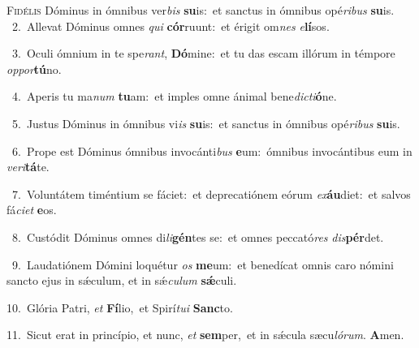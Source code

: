 \lettrine{\initial\textcolor{\initialcolor}{F}}{idélis} Dóminus in ómnibus ver\textit{bis} \textbf{su}\-is:~\star et sanctus in ómnibus opé\-\textit{ri}\-\textit{bus} \textbf{su}\-is.\\
{\numbfont\textcolor{\numbcolor}{~2.}}~Allevat Dóminus omnes \textit{qui} \textbf{cór}\-ruunt:~\star et érigit om\textit{nes} \textit{e}\-\textbf{lí}sos.\par
{\numbfont\textcolor{\numbcolor}{~3.}}~Oculi ómnium in te spe\-\textit{rant}\-, \textbf{Dó}\-mine:~\star et tu das escam illórum in témpore \textit{op}\-\textit{por}\textbf{tú}no.\par
{\numbfont\textcolor{\numbcolor}{~4.}}~Aperis tu ma\textit{num} \textbf{tu}\-am:~\star et imples omne ánimal bene\-\textit{dic}\-\textit{ti}\textbf{ó}ne.\par
{\numbfont\textcolor{\numbcolor}{~5.}}~Justus Dóminus in ómnibus vi\textit{is} \textbf{su}\-is:~\star et sanctus in ómnibus opé\-\textit{ri}\-\textit{bus} \textbf{su}\-is.\par
{\numbfont\textcolor{\numbcolor}{~6.}}~Prope est Dóminus ómnibus invocánti\textit{bus} \textbf{e}\-um:~\star ómnibus invocántibus eum in \textit{ve}\-\textit{ri}\textbf{tá}te.\par
{\numbfont\textcolor{\numbcolor}{~7.}}~Voluntátem timéntium se fáciet:~\dagger et deprecatiónem eórum \textit{ex}\-\textbf{áu}diet:~\star et salvos fá\-\textit{ci}\-\textit{et} \textbf{e}\-os.\par
{\numbfont\textcolor{\numbcolor}{~8.}}~Custódit Dóminus omnes di\-\textit{li}\-\textbf{gén}tes se:~\star et omnes peccató\textit{res} \textit{dis}\-\textbf{pér}det.\par
{\numbfont\textcolor{\numbcolor}{~9.}}~Laudatiónem Dómini loquétur \textit{os} \textbf{me}\-um:~\star et benedícat omnis caro nómini sancto ejus in sǽculum, et in sǽ\-\textit{cu}\-\textit{lum} \textbf{sǽ}\-culi.\par
{\numbfont\textcolor{\numbcolor}{10.}}~Glória Patri, \textit{et} \textbf{Fí}\-lio,~\star et Spirí\-\textit{tu}\-\textit{i} \textbf{Sanc}\-to.\par
{\numbfont\textcolor{\numbcolor}{11.}}~Sicut erat in princípio, et nunc, \textit{et} \textbf{sem}\-per,~\star et in sǽcula sæcu\-\textit{ló}\-\textit{rum}. \textbf{A}\-men.\par
